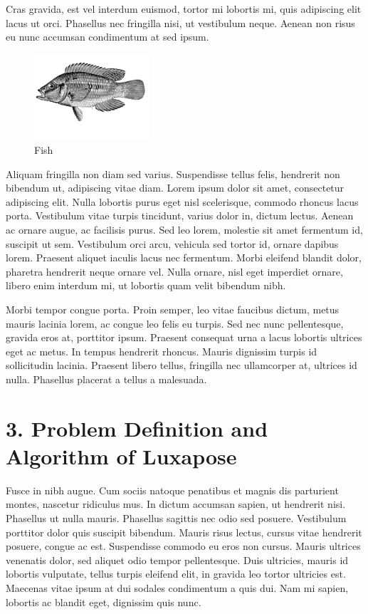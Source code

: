 \documentclass[a4paper, 11pt]{article} %
\begin{document}
Cras gravida, est vel interdum euismod, tortor mi lobortis mi, quis adipiscing elit lacus ut orci. Phasellus nec fringilla nisi, ut vestibulum neque. Aenean non risus eu nunc accumsan condimentum at sed ipsum.
\begin{figure} %
\begin{center}
\includegraphics[width=0.38\textwidth]{fish.png}
\end{center}
\caption{Fish}
\end{figure}
Aliquam fringilla non diam sed varius. Suspendisse tellus felis, hendrerit non bibendum ut, adipiscing vitae diam. Lorem ipsum dolor sit amet, consectetur adipiscing elit. Nulla lobortis purus eget nisl scelerisque, commodo rhoncus lacus porta. Vestibulum vitae turpis tincidunt, varius dolor in, dictum lectus. Aenean ac ornare augue, ac facilisis purus. Sed leo lorem, molestie sit amet fermentum id, suscipit ut sem. Vestibulum orci arcu, vehicula sed tortor id, ornare dapibus lorem. Praesent aliquet iaculis lacus nec fermentum. Morbi eleifend blandit dolor, pharetra hendrerit neque ornare vel. Nulla ornare, nisl eget imperdiet ornare, libero enim interdum mi, ut lobortis quam velit bibendum nibh.

Morbi tempor congue porta. Proin semper, leo vitae faucibus dictum, metus mauris lacinia lorem, ac congue leo felis eu turpis. Sed nec nunc pellentesque, gravida eros at, porttitor ipsum. Praesent consequat urna a lacus lobortis ultrices eget ac metus. In tempus hendrerit rhoncus. Mauris dignissim turpis id sollicitudin lacinia. Praesent libero tellus, fringilla nec ullamcorper at, ultrices id nulla. Phasellus placerat a tellus a malesuada.


\section*{3. Problem Definition and Algorithm of Luxapose}

Fusce in nibh augue. Cum sociis natoque penatibus et magnis dis parturient montes, nascetur ridiculus mus. In dictum accumsan sapien, ut hendrerit nisi. Phasellus ut nulla mauris. Phasellus sagittis nec odio sed posuere. Vestibulum porttitor dolor quis suscipit bibendum. Mauris risus lectus, cursus vitae hendrerit posuere, congue ac est. Suspendisse commodo eu eros non cursus. Mauris ultrices venenatis dolor, sed aliquet odio tempor pellentesque. Duis ultricies, mauris id lobortis vulputate, tellus turpis eleifend elit, in gravida leo tortor ultricies est. Maecenas vitae ipsum at dui sodales condimentum a quis dui. Nam mi sapien, lobortis ac blandit eget, dignissim quis nunc.
\end{document}
